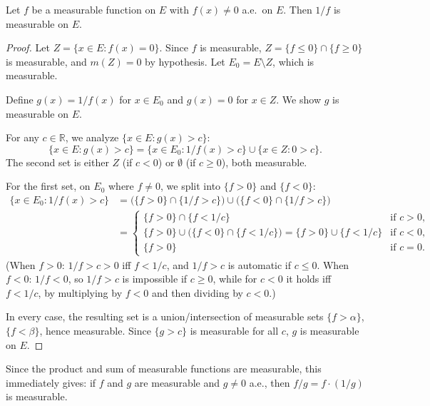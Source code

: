 \documentclass[11pt]{report}
\begin{document}
\begin{propbox}[Measurability of $1/f$]
Let $f$ be a measurable function on $E$ with $f(x) \neq 0$ a.e.\ on $E$. Then $1/f$ is measurable on $E$.
\end{propbox}

\begin{proof}
Let $Z = \{x \in E : f(x) = 0\}$. Since $f$ is measurable, $Z = \{f \leq 0\} \cap \{f \geq 0\}$ is measurable, and $m(Z) = 0$ by hypothesis. Let $E_0 = E \setminus Z$, which is measurable.

Define $g(x) = 1/f(x)$ for $x \in E_0$ and $g(x) = 0$ for $x \in Z$. We show $g$ is measurable on $E$.

For any $c \in \mathbb{R}$, we analyze $\{x \in E : g(x) > c\}$:
\[
\{x \in E : g(x) > c\} = \{x \in E_0 : 1/f(x) > c\} \cup \{x \in Z : 0 > c\}.
\]
The second set is either $Z$ (if $c < 0$) or $\emptyset$ (if $c \geq 0$), both measurable.

For the first set, on $E_0$ where $f \neq 0$, we split into $\{f > 0\}$ and $\{f < 0\}$:
\begin{align*}
\{x \in E_0 : 1/f(x) > c\} &= \bigl(\{f > 0\} \cap \{1/f > c\}\bigr) \cup \bigl(\{f < 0\} \cap \{1/f > c\}\bigr) \\
&= \begin{cases}
\{f > 0\} \cap \{f < 1/c\} & \text{if } c > 0, \\
\{f > 0\} \cup \bigl(\{f < 0\} \cap \{f < 1/c\}\bigr) = \{f > 0\} \cup \{f < 1/c\} & \text{if } c < 0, \\
\{f > 0\} & \text{if } c = 0.
\end{cases}
\end{align*}
(When $f > 0$: $1/f > c > 0$ iff $f < 1/c$, and $1/f > c$ is automatic if $c \leq 0$. When $f < 0$: $1/f < 0$, so $1/f > c$ is impossible if $c \geq 0$, while for $c < 0$ it holds iff $f < 1/c$, by multiplying by $f < 0$ and then dividing by $c < 0$.)

In every case, the resulting set is a union/intersection of measurable sets $\{f > \alpha\}$, $\{f < \beta\}$, hence measurable. Since $\{g > c\}$ is measurable for all $c$, $g$ is measurable on $E$.
\end{proof}

\begin{rembox}
Since the product and sum of measurable functions are measurable, this immediately gives: if $f$ and $g$ are measurable and $g \neq 0$ a.e., then $f/g = f \cdot (1/g)$ is measurable.
\end{rembox}
\end{document}
